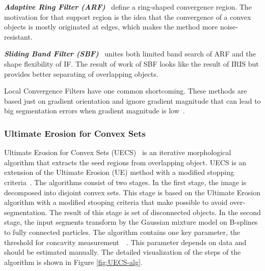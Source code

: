 \documentclass{lutmscthesis}[2010/09/22]
\begin{document}
\textit{\textbf{Adaptive Ring Filter (ARF)}}~\cite{LCF-ARF} define a ring-shaped convergence region. The motivation for that support
region is the idea that the convergence of a convex
objects is mostly originated at edges, which makes the method more noise-resistant.


\textbf{\textit{Sliding Band Filter (SBF)}}~\cite{LCF-SBF} unites both limited band search of ARF and the shape flexibility of IF. 
The result of work of SBF looks like the result of IRIS but provides better separating of overlapping objects.


Local Convergence Filters have one common shortcoming. These methods are based just on gradient orientation and ignore gradient magnitude that can lead to big segmentation errors when gradient magnitude
is low~\cite{LCF}. 



\subsubsection{Ultimate Erosion for Convex Sets}

Ultimate Erosion for Convex Sets (UECS)~\cite{UECS} is an iterative morphological algorithm that extracts
the seed regions from overlapping object. UECS is an extension of the Ultimate Erosion
(UE) method with a modified stopping criteria~\cite{UECS}. The algorithms consist of two stages. In the first stage, the image is decomposed into disjoint convex sets. This stage is based on the Ultimate Erosion algorithm with a modified stooping criteria that make possible to avoid over-segmentation. The result of this stage is set of disconnected objects. In the second stage, the input segments transform by the Gaussian mixture model on B-splines to fully connected particles. The algorithm contains one key parameter, the threshold for concavity measurement~~\cite{zafari-thesis}. This parameter depends on data and should be estimated manually. 
The detailed visualization of the steps of the algorithm is shown in Figure \ref{fig:UECS-alg}.
\end{document}
